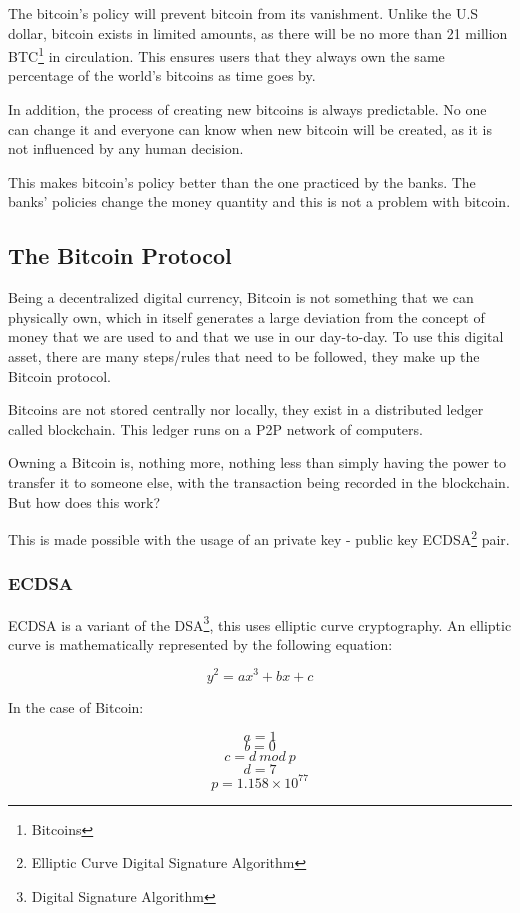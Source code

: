 \documentclass{article}
\newcommand\tab[1][1cm]{\hspace*{#1}}
\begin{document}
\tab The bitcoin's policy will prevent bitcoin from its vanishment. Unlike the U.S dollar, bitcoin exists in limited amounts, as there will be no more than 21 million BTC\footnote{Bitcoins} in circulation. This ensures users that they always own the same percentage of the world's bitcoins as time goes by.

In addition, the process of creating new bitcoins is always predictable. No one can change it and everyone can know when new bitcoin will be created, as it is not influenced by any human decision. 

This makes bitcoin's policy better than the one practiced by the banks. The banks' policies change the money quantity and this is not a problem with bitcoin.

\subsection{The Bitcoin Protocol}

\tab Being a decentralized digital currency, Bitcoin is not something that we can physically own, which in itself generates a large deviation from the concept of money that we are used to and that we use in our day-to-day. To use this digital asset, there are many steps/rules that need to be followed, they make up the Bitcoin protocol.

Bitcoins are not stored centrally nor locally, they exist in a distributed ledger called blockchain. This ledger runs on a P2P network of computers. 

Owning a Bitcoin is, nothing more, nothing less than simply having the power to transfer it to someone else, with the transaction being recorded in the blockchain. But how does this work?

This is made possible with the usage of an private key - public key ECDSA\footnote{Elliptic Curve Digital Signature Algorithm} pair.

\subsubsection{ECDSA}

\tab ECDSA is a variant of the DSA\footnote{Digital Signature Algorithm}, this uses elliptic curve cryptography. An elliptic curve is mathematically represented by the following equation:

\[y^2 = ax^3 + bx + c\]

In the case of Bitcoin:

\[a = 1\]
\[b = 0\]
\[c = d\: mod\: p\]
\[d = 7\]
\[p = 1.158 \times 10^{77}\]
\end{document}
